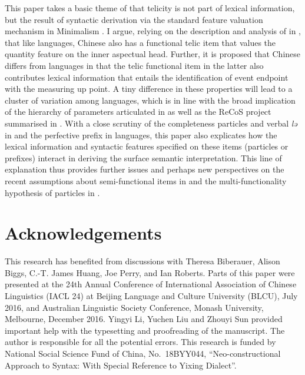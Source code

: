 \documentclass[output=paper]{langsci/langscibook}
\begin{document}
This paper takes a basic theme of \textcite{Borer2005b} that telicity is not
part of lexical information, but the result of syntactic derivation via the
standard feature valuation mechanism in Minimalism
\citep{Chomsky2000,Chomsky2001}. I argue, relying on the description and
analysis of  in \textcite{Huxuhui2016}, that like
languages, Chinese also has a functional telic item that values the quantity
feature on the inner aspectual head.  Further, it is proposed
that Chinese differs from  languages in that the telic functional item in
the latter also contributes lexical information that entails the identification
of event endpoint with the measuring up point. A tiny difference in these
properties will lead to a cluster of variation among languages, which is in
line with the broad implication of the hierarchy of parameters articulated in \textcite{RobHol2010} as well as the ReCoS project
summarised in \textcite{robertsonline}. With a close scrutiny of the
completeness particles and verbal \emph{lə} in  and the
perfective prefix in  languages, this paper also explicates how the
lexical information and syntactic features specified on these items (particles
or prefixes) interact in deriving the surface semantic interpretation. This
line of explanation thus provides further issues and perhaps new perspectives
on the recent assumptions about semi-functional items in
\textcite{huang2015syntactic} and the multi-functionality hypothesis of
particles in \textcite{Biberauer2017,Biberauer2017c}.



\printchapterglossary{}

\section*{Acknowledgements}

This research has benefited from discussions with Theresa Biberauer, Alison
Biggs, C.-T. James Huang, Joe Perry, and Ian Roberts. Parts of this paper were
presented at the 24th Annual Conference of International Association of Chinese
Linguistics (IACL 24) at Beijing Language and Culture University (BLCU), July
2016, and Australian Linguistic Society Conference, Monash University,
Melbourne, December 2016. Yingyi Li, Yuchen Liu and Zhouyi Sun provided
important help with the typesetting and proofreading of the manuscript. The
author is responsible for all the potential errors. This research is funded by
National Social Science Fund of China, No.\ 18BYY044,
\enquote{Neo-constructional Approach to Syntax: With Special Reference to
Yixing Dialect}.

{\sloppy
\printbibliography[heading=subbibliography,notkeyword=this]
}
\end{document}
